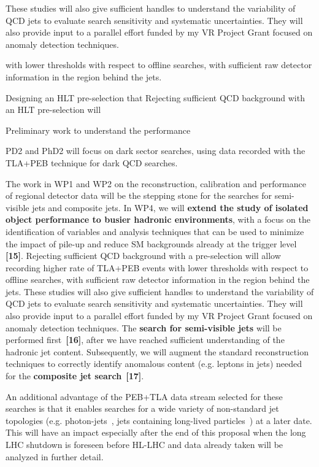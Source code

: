 
These studies will also give sufficient handles to understand the variability of QCD jets to evaluate search sensitivity and systematic uncertainties.
They will also provide input to a parallel effort funded by my VR Project Grant focused on anomaly detection techniques.  




 with lower thresholds with respect to offline searches, with sufficient raw detector information in the region behind the jets. 
 


Designing an HLT pre-selection that 
Rejecting sufficient QCD background with an HLT pre-selection will 

Preliminary work to understand the performance 





PD2 and PhD2 will focus on dark sector searches, using data recorded with the TLA+PEB technique for dark QCD searches. 

The work in WP1 and WP2 on the reconstruction, calibration and performance of regional detector data will be the stepping stone for the searches for semi-visible jets and composite jets. 
In WP4, we will \textbf{extend the study of isolated object performance to busier hadronic environments}, with a focus on the identification of variables and analysis techniques that can be used to minimize the impact of pile-up and reduce SM backgrounds already at the trigger level \textbf{[15]}. 
Rejecting sufficient QCD background with a pre-selection will allow recording higher rate of TLA+PEB events with lower thresholds with respect to offline searches, with sufficient raw detector information in the region behind the jets. 
These studies will also give sufficient handles to understand the variability of QCD jets to evaluate search sensitivity and systematic uncertainties.
They will also provide input to a parallel effort funded by my VR Project Grant focused on anomaly detection techniques.  
The \textbf{search for semi-visible jets} will be performed first~\textbf{[16]}, after we have reached sufficient understanding of the hadronic jet content. 
Subsequently, we will augment the standard reconstruction techniques to correctly identify anomalous content (e.g. leptons in jets) needed for the \textbf{composite jet search}~\textbf{[17]}.

An additional advantage of the PEB+TLA data stream selected for these searches is that it enables searches for a wide variety of non-standard jet topologies (e.g. photon-jets~\cite{PhotonJets}, jets containing long-lived particles~\cite{PhotonJets}) at a later date. 
This will have an impact especially after the end of this proposal when the long LHC shutdown is foreseen before HL-LHC and data already taken will be analyzed in further detail. 


